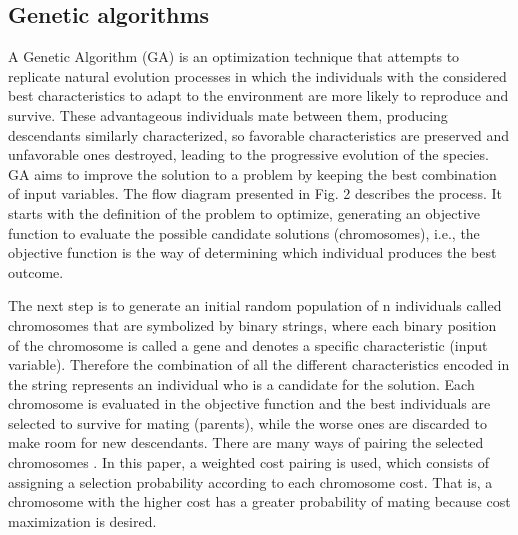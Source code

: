 \subsection{Genetic algorithms}

A Genetic Algorithm (GA) is an optimization technique that attempts to replicate natural evolution 
processes in which the individuals with the considered best characteristics to adapt to the 
environment are more likely to reproduce and survive. These advantageous individuals mate between 
them, producing descendants similarly characterized, so favorable characteristics are preserved and 
unfavorable ones destroyed, leading to the progressive evolution of the species.
GA aims to improve the solution to a problem by keeping the best combination of input variables. The 
flow diagram presented in Fig. 2 describes the process. It starts with the definition of the problem 
to optimize, generating an objective function to evaluate the possible candidate solutions 
(chromosomes), i.e., the objective function is the way of determining which individual produces the 
best outcome. 

The next step is to generate an initial random population of n individuals called chromosomes that 
are symbolized by binary strings, where each binary position of the chromosome is called a gene and 
denotes a specific characteristic (input variable). Therefore the combination of all the different 
characteristics encoded in the string represents an individual who is a candidate for the solution.
Each chromosome is evaluated in the objective function and the best individuals are selected to 
survive for mating (parents), while the worse ones are discarded to make room for new descendants.  
There are many ways of pairing the selected chromosomes \citep{Haupt2004}. In this paper, a weighted 
cost pairing 
is used, which consists of assigning a selection probability according to each chromosome cost. That 
is, a chromosome with the higher cost has a greater probability of mating because cost maximization 
is desired.

